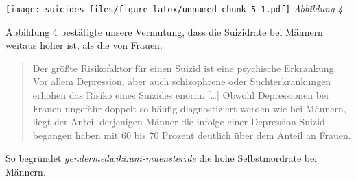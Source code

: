 \documentclass[]{article}
\newenvironment{Shaded}{\begin{snugshade}}{\end{snugshade}}
\newcommand{\DataTypeTok}[1]{\textcolor[rgb]{0.13,0.29,0.53}{#1}}
\newcommand{\DecValTok}[1]{\textcolor[rgb]{0.00,0.00,0.81}{#1}}
\newcommand{\KeywordTok}[1]{\textcolor[rgb]{0.13,0.29,0.53}{\textbf{#1}}}
\newcommand{\NormalTok}[1]{#1}
\newcommand{\OperatorTok}[1]{\textcolor[rgb]{0.81,0.36,0.00}{\textbf{#1}}}
\newcommand{\StringTok}[1]{\textcolor[rgb]{0.31,0.60,0.02}{#1}}
\begin{document}
\texttt{[image: suicides\_files/figure-latex/unnamed-chunk-5-1.pdf]}
\emph{Abbildung 4}

Abbildung 4 bestätigte unsere Vermutung, dass die Suizidrate bei Männern
weitaus höher ist, als die von Frauen.

\begin{quote}
Der größte Risikofaktor für einen Suizid ist eine psychische Erkrankung.
Vor allem Depression, aber auch schizophrene oder Suchterkrankungen
erhöhen das Risiko eines Suizides enorm. {[}\ldots{]} Obwohl
Depressionen bei Frauen ungefähr doppelt so häufig diagnostiziert werden
wie bei Männern, liegt der Anteil derjenigen Männer die infolge einer
Depression Suizid begangen haben mit 60 bis 70 Prozent deutlich über dem
Anteil an Frauen.
\end{quote}

So begründet \emph{gendermedwiki.uni-muenster.de} die hohe
Selbstmordrate bei Männern.

\begin{Shaded}
\end{Shaded}
\end{document}
